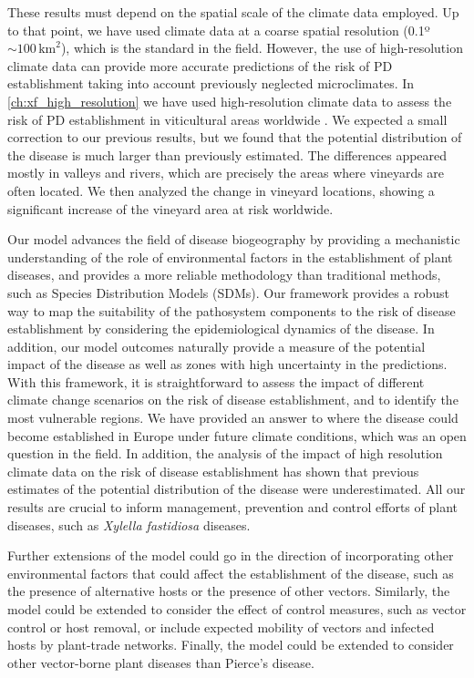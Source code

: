 These results must depend on the spatial scale of the climate data employed. Up
to that point, we have used climate data at a coarse spatial resolution
(0.1º$\sim 100 \, \textrm{km}^2$), which is the standard in the field.
However, the use of high-resolution climate data can provide more accurate
predictions of the risk of PD establishment taking into account previously
neglected microclimates. In \cref{ch:xf_high_resolution} we have used
high-resolution climate data to assess the risk of PD establishment in
viticultural areas worldwide \cite{GimenezRomero2024}. We expected a small
correction to our previous results, but we found that the potential
distribution of the disease is much larger than previously estimated. The
differences appeared mostly in valleys and rivers, which are precisely the
areas where vineyards are often located. We then analyzed the change in
vineyard locations, showing a significant increase of the vineyard area at risk
worldwide.

Our model advances the field of disease biogeography by providing a mechanistic
understanding of the role of environmental factors in the establishment of
plant diseases, and provides a more reliable methodology than traditional
methods, such as Species Distribution Models (SDMs). Our framework
provides a robust way to map the suitability of the pathosystem components to
the risk of disease establishment by considering the  epidemiological dynamics
of the disease. In addition, our model outcomes naturally provide a measure of
the potential impact of the disease as well as zones with high uncertainty in
the predictions. With this framework, it is straightforward to assess the
impact of different climate change scenarios on the risk of disease
establishment, and to identify the most vulnerable regions. We have provided an
answer to where the disease could become established in Europe under future
climate conditions, which was an open question in the field. In addition, the
analysis of the impact of high resolution climate data on the risk of disease
establishment has shown that previous estimates of the potential distribution
of the disease were underestimated. All our results are crucial to inform
management, prevention and control efforts of plant diseases, such as
\textit{Xylella fastidiosa} diseases.

Further extensions of the model could go in the direction of incorporating
other environmental factors that could affect the establishment of the disease,
such as the presence of alternative hosts or the presence of other vectors.
Similarly, the model could be extended to consider the effect of control
measures, such as vector control or host removal, or include expected mobility
of vectors and infected hosts by plant-trade networks. Finally, the model could
be extended to consider other vector-borne plant diseases than Pierce's
disease.

